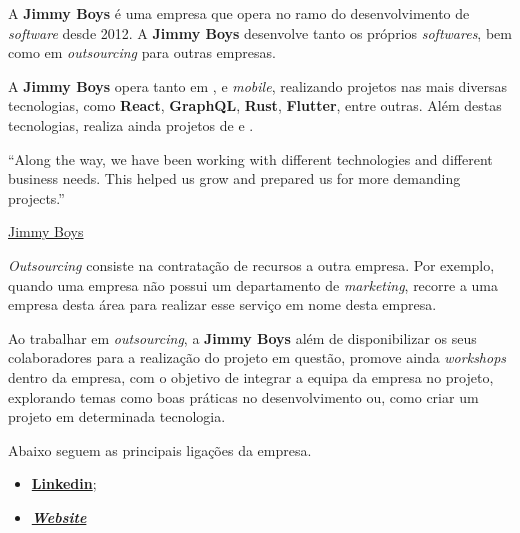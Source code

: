 
\begin{minipage}[t!]{0.35\textwidth}
\end{minipage}
\begin{minipage}[t!]{.65\textwidth}
	\minipagerestore

	A \textbf{Jimmy Boys} é uma empresa que opera no ramo do desenvolvimento de \textit{software} desde 2012. A \textbf{Jimmy Boys} desenvolve tanto os próprios \textit{softwares}, bem como em \textit{outsourcing} para outras empresas.

	A \textbf{Jimmy Boys} opera tanto em \textit{}, \textit{} e \textit{mobile}, realizando projetos nas mais diversas tecnologias, como \textbf{React}, \textbf{GraphQL}, \textbf{Rust}, \textbf{Flutter}, entre outras. Além destas tecnologias, realiza ainda projetos de  e .
\end{minipage}

\vspace{0.2cm}

\begin{flushright}
	\begin{quotebox50}
		``Along the way, we have been working with different technologies and different business needs. This helped us grow and prepared us for more demanding projects.''

		\tcblower

		\href{https://www.jimmyboys.pt/about-us}{Jimmy Boys}
	\end{quotebox50}
\end{flushright}

\vspace{0.2cm}

\textit{Outsourcing} consiste na contratação de recursos a outra empresa. Por exemplo, quando uma empresa não possui um departamento de \textit{marketing}, recorre a uma empresa desta área para realizar esse serviço em nome desta empresa.

Ao trabalhar em \textit{outsourcing}, a \textbf{Jimmy Boys} além de disponibilizar os seus colaboradores para a realização do projeto em questão, promove ainda \textit{workshops} dentro da empresa, com o objetivo de integrar a equipa da empresa no projeto, explorando temas como boas práticas no desenvolvimento ou, como criar um projeto em determinada tecnologia.

Abaixo seguem as principais ligações da empresa.

\begin{itemize}
	\item \textbf{\href{https://www.linkedin.com/company/jimmy-boys/}{Linkedin}};
	\item \textbf{\href{https://jimmyboys.pt}{\textit{Website}}}
\end{itemize}

\newpage